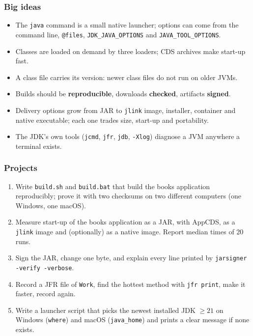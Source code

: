 \documentclass[aspectratio=169,10pt,compress]{beamer}
\begin{document}
\begin{frame}[t,fragile] \frametitle{Big ideas}
  \begin{itemize}
    \item The \texttt{java} command is a small native launcher; options can come from the command line, \texttt{@files},
      \texttt{JDK\_JAVA\_OPTIONS} and \texttt{JAVA\_TOOL\_OPTIONS}.
    \item Classes are loaded on demand by three loaders; CDS archives make start-up fast.
    \item A class file carries its version: newer class files do not run on older JVMs.
    \item Builds should be \textbf{reproducible}, downloads \textbf{checked}, artifacts \textbf{signed}.
    \item Delivery options grow from JAR to \texttt{jlink} image, installer, container and native executable;
      each one trades size, start-up and portability.
    \item The JDK's own tools (\texttt{jcmd}, \texttt{jfr}, \texttt{jdb}, \texttt{-Xlog}) diagnose a JVM anywhere a terminal exists.
  \end{itemize}
\end{frame}




\begin{frame}[t,fragile] \frametitle{Projects}
  \begin{enumerate}\small
    \item Write \texttt{build.sh} and \texttt{build.bat} that build the books application reproducibly; prove it with two
      checksums on two different computers (one Windows, one macOS).
    \item Measure start-up of the books application as a JAR, with AppCDS, as a \texttt{jlink} image and (optionally) as a
      native image. Report median times of 20 runs.
    \item Sign the JAR, change one byte, and explain every line printed by \texttt{jarsigner -verify -verbose}.
    \item Record a JFR file of \texttt{Work}, find the hottest method with \texttt{jfr print}, make it faster, record again.
    \item Write a launcher script that picks the newest installed JDK $\geq 21$ on Windows (\texttt{where}) and macOS
      (\texttt{java\_home}) and prints a clear message if none exists.
  \end{enumerate}
\end{frame}




\begin{frame}[t,fragile]
	\begin{center}
		\vspace{4cm}
	\end{center}
\end{frame}
\end{document}
